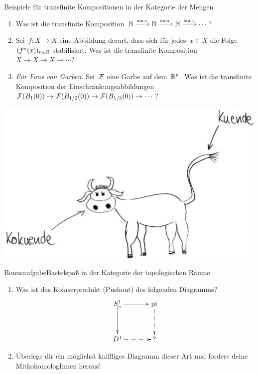 \documentclass{uebblatt}
\newcommand{\sukk}{\mathrm{succ}}
\begin{document}
\begin{aufgabe}{Beispiele für transfinite Kompositionen in der Kategorie der Mengen}
\begin{enumerate}
\item Was ist die transfinite Komposition~$\NN \xra{\sukk} \NN \xra{\sukk} \NN
\xra{\sukk} \cdots$?
\item Sei~$f : X \to X$ eine Abbildung derart, dass sich für jedes~$x \in X$
die Folge~$(f^n(x))_{n \in \mathbb{N}}$ stabilisiert. Was ist die transfinite
Komposition~$X \to X \to X \to \cdots$?
\item \emph{Für Fans von Garben.} Sei~$\mathcal{F}$ eine Garbe auf dem~$\mathbb{R}^n$. Was ist
die transfinite Komposition der Einschränkungsabbildungen~$\mathcal{F}(B_1(0)) \to
\mathcal{F}(B_{1/2}(0)) \to \mathcal{F}(B_{1/3}(0)) \to \cdots$?
\end{enumerate}
\end{aufgabe}

{\centering
\includegraphics[scale=0.6]{images/kuende}
\par}

\newpage

\begin{aufgabe*}{Bonusaufgabe}{Bastelspaß in der Kategorie der topologischen Räume}
\begin{enumerate}
\item Was ist das Kofaserprodukt (Pushout) des folgenden Diagramms?
\[ \xymatrixcolsep{3pc}\xymatrixrowsep{3pc}\xymatrix{
  S^1 \ar[r] \ar@{^{(}->}[d] & \mathrm{pt} \ar@{-->}[d] \\
  D^1 \ar@{-->}[r] & ?
} \]
\item Überlege dir ein möglichst kniffliges Diagramm dieser Art und fordere
deine MitkohomologInnen heraus!
\end{enumerate}
\end{aufgabe*}
\end{document}
